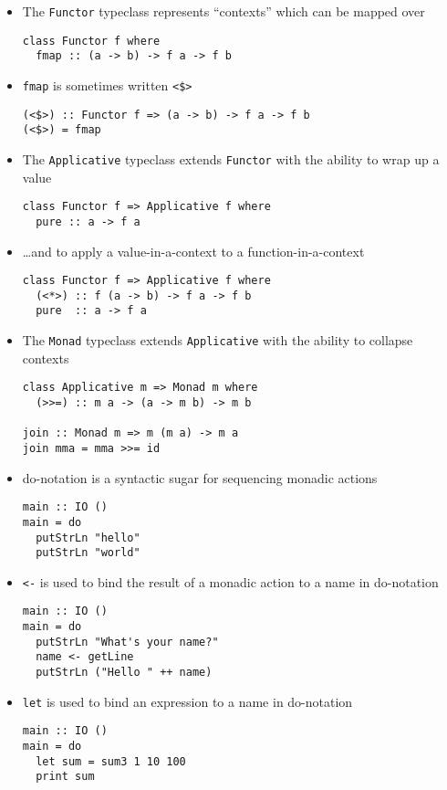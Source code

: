 \begin{itemize}
\pagebreak
\item The \verb|Functor| typeclass represents ``contexts'' which can
  be mapped over
\begin{verbatim}
class Functor f where
  fmap :: (a -> b) -> f a -> f b
\end{verbatim}

\item \verb|fmap| is sometimes written \verb|<$>|
\begin{verbatim}
(<$>) :: Functor f => (a -> b) -> f a -> f b
(<$>) = fmap
\end{verbatim}

\item The \verb|Applicative| typeclass extends \verb|Functor| with the
  ability to wrap up a value
\begin{verbatim}
class Functor f => Applicative f where
  pure :: a -> f a
\end{verbatim}

\item \ldots{}and to apply a value-in-a-context to a
  function-in-a-context
\begin{verbatim}
class Functor f => Applicative f where
  (<*>) :: f (a -> b) -> f a -> f b
  pure  :: a -> f a
\end{verbatim}

\item The \verb|Monad| typeclass extends \verb|Applicative| with the
  ability to collapse contexts
\begin{verbatim}
class Applicative m => Monad m where
  (>>=) :: m a -> (a -> m b) -> m b

join :: Monad m => m (m a) -> m a
join mma = mma >>= id
\end{verbatim}

\item do-notation is a syntactic sugar for sequencing monadic actions
\begin{verbatim}
main :: IO ()
main = do
  putStrLn "hello"
  putStrLn "world"
\end{verbatim}

\item \verb|<-| is used to bind the result of a monadic action to a
  name in do-notation
\begin{verbatim}
main :: IO ()
main = do
  putStrLn "What's your name?"
  name <- getLine
  putStrLn ("Hello " ++ name)
\end{verbatim}

\item \verb|let| is used to bind an expression to a name in
  do-notation
\begin{verbatim}
main :: IO ()
main = do
  let sum = sum3 1 10 100
  print sum
\end{verbatim}
\end{itemize}
